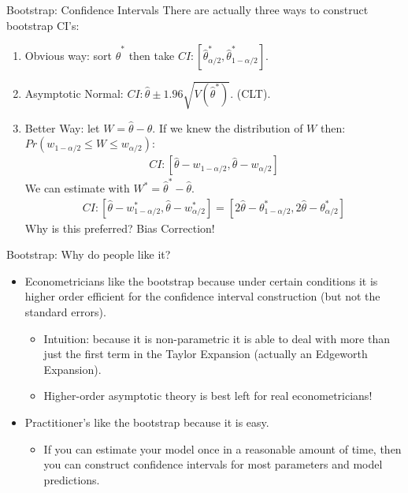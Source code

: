 \begin{frame}{Bootstrap: Confidence Intervals}
There are actually three ways to construct bootstrap CI's:
\begin{enumerate}
\item Obvious way: sort  $\hat{\theta}^{*}$ then take $CI: [\hat{\theta}^{*}_{\alpha/2},\hat{\theta}^{*}_{1-\alpha/2}]$.
\item Asymptotic Normal:  $CI: \hat{\theta} \pm 1.96 \sqrt{V(\hat{\theta}^{*})}$. (CLT).
\item Better Way: let $W= \hat{\theta} -\theta$. If we knew the distribution of $W$ then: $Pr(w_{1-\alpha/2} \leq W \leq w_{\alpha/2})$:
\begin{eqnarray*}
CI: [\hat{\theta} -w_{1-\alpha/2}, \hat{\theta} -w_{\alpha/2}]
\end{eqnarray*}
We can estimate with $W^{*} = \hat{\theta}^{*} - \hat{\theta}$.
\begin{eqnarray*}
CI: [\hat{\theta} -w^*_{1-\alpha/2}, \hat{\theta} -w^*_{\alpha/2}] = [2 \hat{\theta} -\theta^*_{1-\alpha/2}, 2 \hat{\theta} -\theta^*_{\alpha/2}]
\end{eqnarray*}
Why is this preferred? Bias Correction!
\end{enumerate}

\end{frame}


\begin{frame}{Bootstrap: Why do people like it?}
\begin{itemize}
\item Econometricians like the bootstrap because under certain conditions it is \alert{higher order efficient} for the confidence interval construction (but not the standard errors).
\begin{itemize}
\item Intuition: because it is non-parametric it is able to deal with more than just the first term in the Taylor Expansion (actually an \alert{Edgeworth Expansion}).
\item Higher-order asymptotic theory is best left for real econometricians!
\end{itemize}
\item Practitioner's like the bootstrap because it is easy.
\begin{itemize}
\item If you can estimate your model once in a reasonable amount of time, then you can construct confidence intervals for most parameters and model predictions.
\end{itemize}
\end{itemize}
\end{frame}

